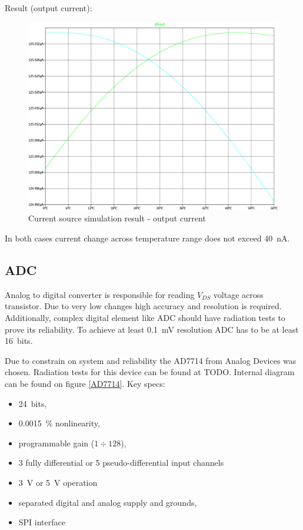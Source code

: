         Result (output current):

        \begin{figure}[H]
            \centering
            \includegraphics[width=0.8\paperwidth]{img/06/current_source_result.eps}
            \caption{Current source simulation result - output current}
            \label{current_source_simulation_result}
        \end{figure}

        In both cases current change across temperature range does not exceed \SI{40}{\nano\ampere}.

    \subsection{ADC}
        Analog to digital converter is responsible for reading $V_{DS}$ voltage across transistor. Due to very low changes high accuracy and resolution is required. Additionally, complex digital element like ADC should have radiation tests to prove its reliability. To achieve at least \SI{0.1}{\milli\volt} resolution ADC has to be at least \SI{16}{bits}.

        Due to constrain on system and reliability the AD7714 from Analog Devices was chosen. Radiation tests for this device can be found at TODO. Internal diagram can be found on figure \ref{AD7714}. Key specs:
        \begin{itemize}
            \item \SI{24}{bits},
            \item \SI{0.0015}{\percent} nonlinearity,
            \item programmable gain ($1 \div 128$),
            \item 3 fully differential or 5 pseudo-differential input channels
            \item \SI{3}{\volt} or \SI{5}{\volt} operation
            \item separated digital and analog supply and grounds,
            \item SPI interface
        \end{itemize}

